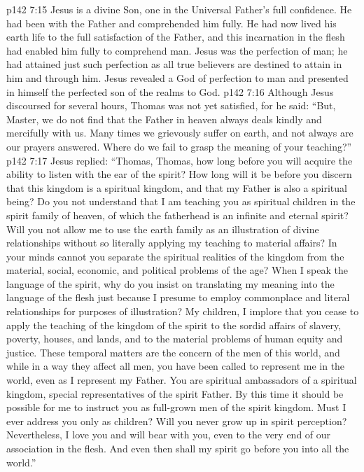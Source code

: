 \vs p142 7:15 Jesus is a divine Son, one in the Universal Father’s full confidence. He had been with the Father and comprehended him fully. He had now lived his earth life to the full satisfaction of the Father, and this incarnation in the flesh had enabled him fully to comprehend man. Jesus was the perfection of man; he had attained just such perfection as all true believers are destined to attain in him and through him. Jesus revealed a God of perfection to man and presented in himself the perfected son of the realms to God.
\vs p142 7:16 Although Jesus discoursed for several hours, Thomas was not yet satisfied, for he said: “But, Master, we do not find that the Father in heaven always deals kindly and mercifully with us. Many times we grievously suffer on earth, and not always are our prayers answered. Where do we fail to grasp the meaning of your teaching?”
\vs p142 7:17 Jesus replied: \textcolor{ubdarkred}{“Thomas, Thomas, how long before you will acquire the ability to listen with the ear of the spirit? How long will it be before you discern that this kingdom is a spiritual kingdom, and that my Father is also a spiritual being? Do you not understand that I am teaching you as spiritual children in the spirit family of heaven, of which the fatherhead is an infinite and eternal spirit? Will you not allow me to use the earth family as an illustration of divine relationships without so literally applying my teaching to material affairs? In your minds cannot you separate the spiritual realities of the kingdom from the material, social, economic, and political problems of the age? When I speak the language of the spirit, why do you insist on translating my meaning into the language of the flesh just because I presume to employ commonplace and literal relationships for purposes of illustration? My children, I implore that you cease to apply the teaching of the kingdom of the spirit to the sordid affairs of slavery, poverty, houses, and lands, and to the material problems of human equity and justice. These temporal matters are the concern of the men of this world, and while in a way they affect all men, you have been called to represent me in the world, even as I represent my Father. You are spiritual ambassadors of a spiritual kingdom, special representatives of the spirit Father. By this time it should be possible for me to instruct you as full\hyp{}grown men of the spirit kingdom. Must I ever address you only as children? Will you never grow up in spirit perception? Nevertheless, I love you and will bear with you, even to the very end of our association in the flesh. And even then shall my spirit go before you into all the world.”}
